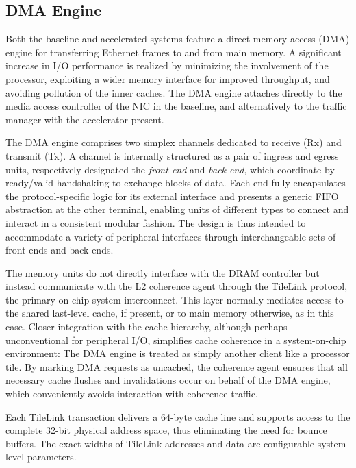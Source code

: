 \subsection{DMA Engine}

Both the baseline and accelerated systems feature a direct memory access
(DMA) engine for transferring Ethernet frames to and from main memory.
A significant increase in I/O performance is realized by minimizing the
involvement of the processor, exploiting a wider memory interface for
improved throughput, and avoiding pollution of the inner caches.
The DMA engine attaches directly to the media access controller of the
NIC in the baseline, and alternatively to the traffic manager with the
accelerator present.

The DMA engine comprises two simplex channels dedicated to receive (Rx)
and transmit (Tx).
A channel is internally structured as a pair of ingress and egress
units, respectively designated the \emph{front-end} and \emph{back-end},
which coordinate by ready/valid handshaking to exchange blocks of data.
Each end fully encapsulates the protocol-specific logic for its
external interface and presents a generic FIFO abstraction at the other
terminal, enabling units of different types to connect and interact in a
consistent modular fashion.
The design is thus intended to accommodate a variety of peripheral
interfaces through interchangeable sets of front-ends and back-ends.

The memory units do not directly interface with the DRAM controller but
instead communicate with the L2 coherence agent through the TileLink
protocol, the primary on-chip system interconnect.
This layer normally mediates access to the shared last-level cache, if
present, or to main memory otherwise, as in this case.
Closer integration with the cache hierarchy, although perhaps
unconventional for peripheral I/O, simplifies cache coherence in a
system-on-chip environment:
The DMA engine is treated as simply another client like a processor
tile.
By marking DMA requests as uncached, the coherence agent ensures that
all necessary cache flushes and invalidations occur on behalf of the DMA
engine, which conveniently avoids interaction with coherence traffic.

Each TileLink transaction delivers a 64-byte cache line and supports
access to the complete 32-bit physical address space, thus eliminating
the need for bounce buffers.
The exact widths of TileLink addresses and data are configurable
system-level parameters.


